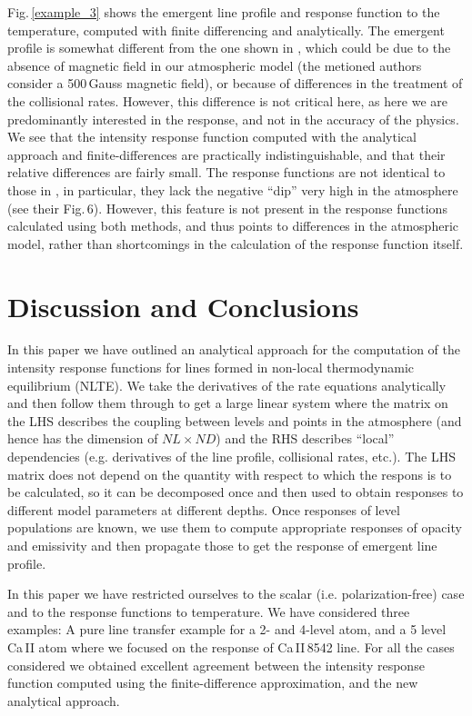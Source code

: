 \documentclass[referee]{aa}
\begin{document}
Fig.\,\ref{example_3} shows the emergent line profile and response function to the temperature, computed with finite differencing and analytically. The emergent profile is somewhat different from the one shown in \cite{Ca_diag_Jaime}, which could be due to the absence of magnetic field in our atmospheric model (the metioned authors consider a 500\,Gauss magnetic field), or because of differences in the treatment of the collisional rates. However, this difference is not critical here, as here we are predominantly interested in the response, and not in the accuracy of the physics. We see that the intensity response function computed with the analytical approach and finite-differences are practically indistinguishable, and that their relative differences are fairly small. The response functions are not identical to those in \cite{Ca_diag_Jaime}, in particular, they lack the negative ``dip'' very high in the atmosphere (see their Fig.\,6). However, this feature is not present in the response functions calculated using both methods, and thus points to differences in the atmospheric model, rather than shortcomings in the calculation of the response function itself.

\section{Discussion and Conclusions}

In this paper we have outlined an analytical approach for the computation of the intensity response functions for lines formed in non-local thermodynamic equilibrium (NLTE). We take the derivatives of the rate equations analytically and then follow them through to get a large linear system where the matrix on the LHS describes the coupling between levels and points in the atmosphere (and hence has the dimension of $NL\times ND$) and the RHS describes ``local'' dependencies (e.g. derivatives of the line profile, collisional rates, etc.). The LHS matrix does not depend on the quantity with respect to which the respons is to be calculated, so it can be decomposed once and then used to obtain responses to different model parameters at different depths. Once responses of level populations are known, we use them to compute appropriate responses of opacity and emissivity and then propagate those to get the response of emergent line profile. 

In this paper we have restricted ourselves to the scalar (i.e. polarization-free) case and to the response functions to temperature. We have considered three examples: A pure line transfer example for a 2- and 4-level atom, and a 5 level Ca\,II atom where we focused on the response of Ca\,II\,8542 line. For all the cases considered we obtained excellent agreement between the intensity response function computed using the finite-difference approximation, and the new analytical approach. 
\end{document}
